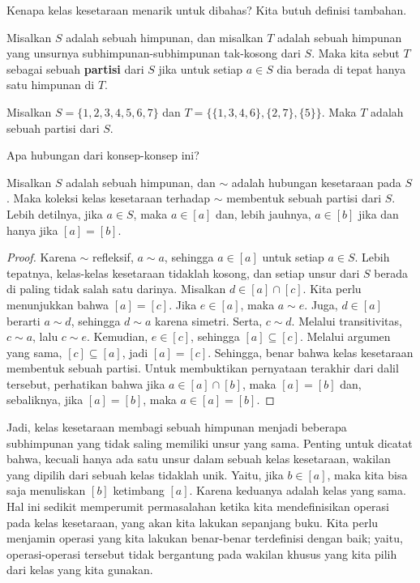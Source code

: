 Kenapa kelas kesetaraan menarik untuk dibahas? Kita butuh definisi tambahan.

\begin{defn}
Misalkan $S$ adalah sebuah himpunan, dan misalkan $T$ adalah sebuah himpunan yang unsurnya subhimpunan-subhimpunan tak-kosong dari $S$. Maka kita sebut $T$ sebagai sebuah \textbf{partisi} dari $S$ jika untuk setiap $a \in S$ dia berada di tepat hanya satu himpunan di $T$.
\end{defn}

\begin{exmp}
\label{exmp1.16}
Misalkan $S = \{1,2,3,4,5,6,7\}$ dan $T = \{ \{1,3,4,6\}, \{2,7\}, \{5\} \}$. Maka $T$ adalah sebuah partisi dari $S$.
\end{exmp}

Apa hubungan dari konsep-konsep ini?

\begin{thm}
\label{thm1.1}
Misalkan $S$ adalah sebuah himpunan, dan $\sim$ adalah hubungan kesetaraan pada $S$. Maka koleksi kelas kesetaraan terhadap $\sim$ membentuk sebuah partisi dari $S$. Lebih detilnya, jika $a \in S$, maka $a \in [a]$ dan, lebih jauhnya, $a \in [b]$ jika dan hanya jika $[a] = [b]$.
\end{thm}

\begin{proof}
Karena $\sim$ refleksif, $a \sim a$, sehingga $a \in [a]$ untuk setiap $a \in S$. Lebih tepatnya, kelas-kelas kesetaraan tidaklah kosong, dan setiap unsur dari $S$ berada di paling tidak salah satu darinya. Misalkan $d \in [a] \cap [c]$. Kita perlu menunjukkan bahwa $[a] = [c]$. Jika $e \in [a]$, maka $a \sim e$. Juga, $d\in [a]$ berarti $a \sim d$, sehingga $d \sim a$ karena simetri. Serta, $c \sim d$. Melalui transitivitas, $c \sim a$, lalu $c \sim e$. Kemudian, $e \in [c]$, sehingga $[a] \subseteq [c]$. Melalui argumen yang sama, $[c] \subseteq [a]$, jadi $[a] = [c]$. Sehingga, benar bahwa kelas kesetaraan membentuk sebuah partisi. Untuk membuktikan pernyataan terakhir dari dalil tersebut, perhatikan bahwa jika $a \in [a] \cap [b]$, maka $[a] = [b]$ dan, sebaliknya, jika $[a] = [b]$, maka $a \in [a] = [b]$.
\end{proof}

Jadi, kelas kesetaraan membagi sebuah himpunan menjadi beberapa subhimpunan yang tidak saling memiliki unsur yang sama. Penting untuk dicatat bahwa, kecuali hanya ada satu unsur dalam sebuah kelas kesetaraan, wakilan yang dipilih dari sebuah kelas tidaklah unik. Yaitu, jika $b \in [a]$, maka kita bisa saja menuliskan $[b]$ ketimbang $[a]$. Karena keduanya adalah kelas yang sama. Hal ini sedikit memperumit permasalahan ketika kita mendefinisikan operasi pada kelas kesetaraan, yang akan kita lakukan sepanjang buku. Kita perlu menjamin operasi yang kita lakukan benar-benar terdefinisi dengan baik; yaitu, operasi-operasi tersebut tidak bergantung pada wakilan khusus yang kita pilih dari kelas yang kita gunakan.

